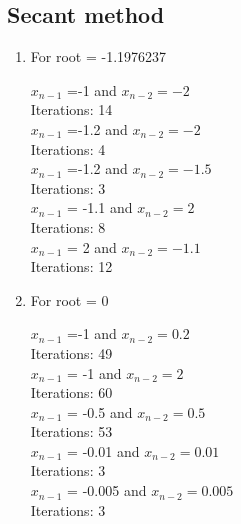 \documentclass{article}
\begin{document}
\subsection{Secant method}
\begin{tcolorbox}[colback=blue!10, colframe=gray!80, width=\textwidth, sharp corners]

\begin{enumerate}

\item For root = -1.1976237
\begin{center}

    $x_{n-1}$ =-1  and $x_{n-2} = -2 $\\
    Iterations: 14 \\
    \vspace{0.3cm}
    $x_{n-1}$ =-1.2  and $x_{n-2} =-2  $\\
    Iterations:  4 \\
    \vspace{0.3cm}
    $x_{n-1}$ =-1.2  and $x_{n-2} =-1.5  $\\
    Iterations: 3 \\
    \vspace{0.3cm}
    $x_{n-1}$ = -1.1  and $x_{n-2} = 2  $\\
    Iterations: 8  \\
    \vspace{0.3cm}
    $x_{n-1}$ = 2 and $x_{n-2} = -1.1  $\\
    Iterations: 12 \\
      
\end{center}
\item For root = 0
\begin{center}

    $x_{n-1}$ =-1  and $x_{n-2} = 0.2 $\\
    Iterations: 49 \\
    \vspace{0.3cm}
    $x_{n-1}$ = -1  and $x_{n-2} =2  $\\
    Iterations: 60 \\
    \vspace{0.3cm}
    $x_{n-1}$ = -0.5 and $x_{n-2} = 0.5 $\\
    Iterations: 53 \\
    \vspace{0.3cm}
    $x_{n-1}$ = -0.01  and $x_{n-2} = 0.01 $\\
    Iterations: 3 \\
    \vspace{0.3cm}
    $x_{n-1}$ = -0.005 and $x_{n-2} =0.005  $\\
    Iterations: 3 \\
      

\end{center}
\end{enumerate}
\end{tcolorbox}
\end{document}
